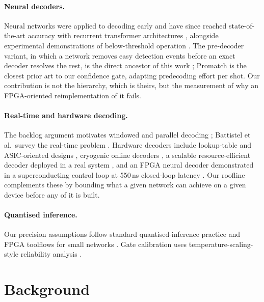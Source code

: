 \documentclass[pdflatex,sn-mathphys-num]{sn-jnl}
\begin{document}
\paragraph{Neural decoders.} Neural networks were applied to decoding early
\cite{torlai2017neural, varsamopoulos2017decoding} and have since reached
state-of-the-art accuracy with recurrent transformer architectures
\cite{bausch2024alphaqubit}, alongside experimental demonstrations of
below-threshold operation \cite{google2025belowthreshold}. The pre-decoder
variant, in which a network removes easy detection events before an exact
decoder resolves the rest, is the direct ancestor of this work
\cite{chamberland2026fast}; Promatch \cite{alavisamani2024promatch} is
the closest prior art to our confidence gate, adapting predecoding effort per
shot. Our contribution is not the hierarchy, which is theirs, but the
measurement of why an FPGA-oriented reimplementation of it fails.

\paragraph{Real-time and hardware decoding.} The backlog argument
\cite{terhal2015quantum} motivates windowed and parallel decoding
\cite{skoric2023parallel}; Battistel et al.\ survey the real-time problem
\cite{battistel2023realtime}. Hardware decoders include lookup-table and
ASIC-oriented designs \cite{das2022lilliput, das2022afs}, cryogenic online
decoders \cite{ueno2021qecool, ueno2022qulatis}, a scalable
resource-efficient decoder deployed in a real system
\cite{barber2025realtime}, and an FPGA neural decoder demonstrated in a
superconducting control loop at 550\,ns closed-loop latency
\cite{yang2026realtime}. Our roofline complements these by bounding what a
given network can achieve on a given device before any of it is built.

\paragraph{Quantised inference.} Our precision assumptions follow standard
quantised-inference practice \cite{jacob2018quantization, hubara2017quantized}
and FPGA toolflows for small networks \cite{umuroglu2017finn, duarte2018hls4ml}.
Gate calibration uses temperature-scaling-style reliability analysis
\cite{guo2017calibration, niculescu2005predicting}.

\section{Background}\label{sec:background}
\end{document}
